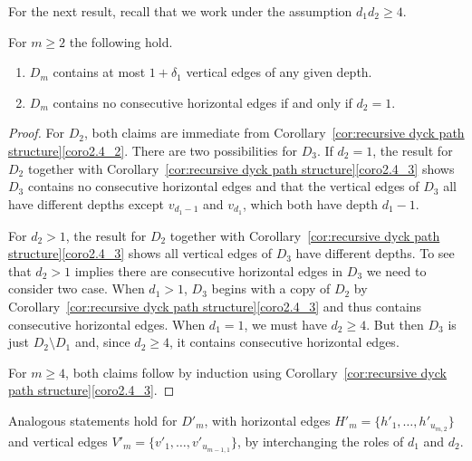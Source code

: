 \documentclass[ALCO,ThmDefs,Unicode,epreuves]{cedram}
\begin{document}
For the next result, recall that we work under the assumption $d_1d_2\ge4$.
\begin{corollary}
 \label{cor:edge restrictions}
 For $m\ge2$ the following hold.
 \begin{enumerate}[label=(\alph*)]
 \item $D_m$ contains at most $1+\delta_1$ vertical edges of any given depth.
 \item $D_m$ contains no consecutive horizontal edges if and only if $d_2=1$.
 \end{enumerate}
\end{corollary}
\begin{proof}
 For $D_2$, both claims are immediate from Corollary~\ref{cor:recursive dyck path structure}\ref{coro2.4_2}.
 There are two possibilities for $D_3$.
 If $d_2=1$, the result for $D_2$ together with Corollary~\ref{cor:recursive dyck path structure}\ref{coro2.4_3} shows $D_3$ contains no consecutive horizontal edges and that the vertical edges of $D_3$ all have different depths except $v_{d_1-1}$ and $v_{d_1}$, which both have depth $d_1-1$.
 
 For $d_2>1$, the result for $D_2$ together with Corollary~\ref{cor:recursive dyck path structure}\ref{coro2.4_3} shows all vertical edges of $D_3$ have different depths.
 To see that $d_2>1$ implies there are consecutive horizontal edges in $D_3$ we need to consider two case.
 When $d_1>1$, $D_3$ begins with a copy of $D_2$ by Corollary~\ref{cor:recursive dyck path structure}\ref{coro2.4_3} and thus contains consecutive horizontal edges.
 When $d_1=1$, we must have $d_2\ge4$.
 But then $D_3$ is just $D_2\setminus D_1$ and, since $d_2\ge4$, it contains consecutive horizontal edges. 

 For $m\ge4$, both claims follow by induction using Corollary~\ref{cor:recursive dyck path structure}\ref{coro2.4_3}.
\end{proof}
Analogous statements hold for $D'_m$, with horizontal edges $H'_m=\{h'_1,\ldots,h'_{u_{m,2}}\}$ and vertical edges $V'_m=\{v'_1,\ldots,v'_{u_{m-1,1}}\}$, by interchanging the roles of $d_1$ and $d_2$.
\end{document}

